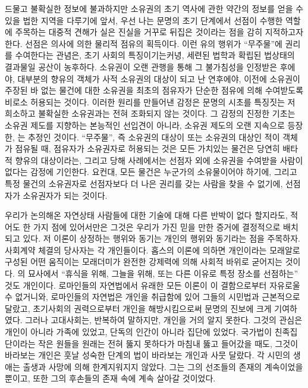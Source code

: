 드물고 불확실한 정보에 불과하지만
소유권의 초기 역사에 관한 약간의 정보를 얻을 수 있을 법한 지역을 다루기에 앞서,
우선 나는
문명의 초기 단계에서 선점이 수행한 역할에 주목하는 대중적 견해가
실은 진실을 거꾸로 뒤집은 것이라는 점을 감히 지적하고자 한다.
선점은 의사에 의한 물리적 점유의 획득이다.
이런 유의 행위가 ``무주물''에 권리를 수여한다는 관념은,
초기 사회의 특징이기는커녕,
세련된 법학과 확립된 법상태의 결과물일 공산이 농후하다.
소유권이
오랜 관행을 통해
그 불가침성을
인정받은 후에야,
대부분의 향유의 객체가 사적 소유권의 대상이 되고 난 연후에야,
이전에 소유권이 주장된 바 없는 물건에 대한 소유권을
최초의 점유자가
단순한 점유에 의해
수여받도록
비로소
허용되는 것이다.
이러한 원리를 만들어낸 감정은
문명의 시초를 특징짓는
저 희소하고 불확실한 소유권과는 전혀 조화되지 않는 것이다.
그 감정의 진정한 기초는
소유권 제도를 지향하는 본능적인 선입견이 아니라,
소유권 제도의 오랜 지속으로 등장한,
는 추정인 것이다.
``무주물'', 즉
소유권의 대상이 
또는 소유권의 대상인 적이 
객체가 점유될 때,
점유자가 소유권자로 허용되는 것은
모든 가치있는 물건은 당연히 배타적 향유의 대상이라는,
그리고
당해 사례에서는
선점자 외에 소유권을 수여받을 사람이 없다는 감정에
기인한다.
요컨대,
모든 물건은 누군가의 소유물이어야 하기에,
그리고
특정 물건의 소유권자로 선점자보다 더 나은 권리를 갖는
사람을 찾을 수 없기에,
선점자가 소유권자가 되는 것이다.

우리가 논의해온 자연상태 사람들에 대한 기술에 대해
다른 반박이 없다 할지라도,
적어도 한 가지 점에 있어서만은
그것은 우리가 가진 믿을 만한 증거에 결정적으로 배치되고 있다.
저 이론이 상정하는 행위와 동기는 개인의 행위와 동기라는 점을 주목하자.
사회계약 체결의 당사자는 각 개인들이다.
홉스의 이론에 의하면
개인이라는 모래알로 구성된 어떤 움직이는 모래더미가
완전한 강제력에 의해 사회적 바위로 굳어지는 것이다.
의 묘사에서
``휴식을 위해, 그늘을 위해, 또는 다른 이유로 특정 장소를 선점하는''
것도 개인이다.
로마인들의 자연법에서 유래한 모든 이론이
이 결함으로부터 자유로울 수 없거니와,
로마인들의 자연법은 개인을 취급함에 있어 그들의 시민법과 근본적으로 달랐고,
초기사회의 권력으로부터 개인을 해방시킴으로써
문명의 진보에 크게 기여하였다.
그러나 고대사회는, 반복하여 말하지만,
개인을 거의 알지 못한다.
그것의 관심은 개인이 아니라 가족에 있었고,
단독의 인간이 아니라 집단에 있었다.
국가법이 친족집단이라는 작은 원들을
원래는 전혀 뚫지 못하다가
마침내 뚫고 들어갔을 때도,
그것이 바라보는 개인은 훗날 성숙한 단계의 법이 바라보는 개인과
사뭇 달랐다.
각 시민의 생애는
출생과 사망에 의해 한계지워지지 않았다.
그는 그의 선조들의 존재의 계속이었을 뿐이고,
또한 그의 후손들의 존재 속에 계속 살아갈 것이었다.

